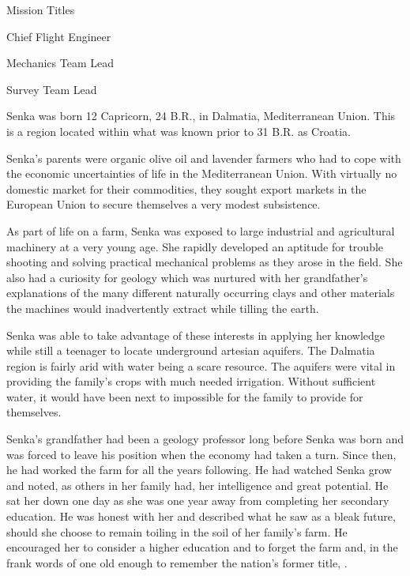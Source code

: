 {        \bTR
            \bTC Mission Titles \eTC
            \bTC 
                \startitemize[4]
                \startpacked
                \item Chief Flight Engineer
                \item Mechanics Team Lead
                \item Survey Team Lead
                \stoppacked
                \stopitemize
            \eTC
        \eTR
    \eTABLEbody

\eTABLE
}

Senka was born 12 Capricorn, 24 B.R., in Dalmatia, Mediterranean Union. This is a region located within what was known prior to 31 B.R. as Croatia.

Senka's parents were organic olive oil and lavender farmers who had to cope with the economic uncertainties of life in the Mediterranean Union. With virtually no domestic market for their commodities, they sought export markets in the European Union to secure themselves a very modest subsistence.

As part of life on a farm, Senka was exposed to large industrial and agricultural machinery at a very young age. She rapidly developed an aptitude for trouble shooting and solving practical mechanical problems as they arose in the field. She also had a curiosity for geology which was nurtured with her grandfather's explanations of the many different naturally occurring clays and other materials the machines would inadvertently extract while tilling the earth. 

Senka was able to take advantage of these interests in applying her knowledge while still a teenager to locate underground artesian aquifers. The Dalmatia region is fairly arid with water being a scare resource. The aquifers were vital in providing the family's crops with much needed irrigation. Without sufficient water, it would have been next to impossible for the family to provide for themselves.

Senka's grandfather had been a geology professor long before Senka was born and was forced to leave his position when the economy had taken a turn. Since then, he had worked the farm for all the years following. He had watched Senka grow and noted, as others in her family had, her intelligence and great potential. He sat her down one day as she was one year away from completing her secondary education. He was honest with her and described what he saw as a bleak future, should she choose to remain toiling in the soil of her family's farm. He encouraged her to consider a higher education and to forget the farm and, in the frank words of one old enough to remember the nation's former title, .

